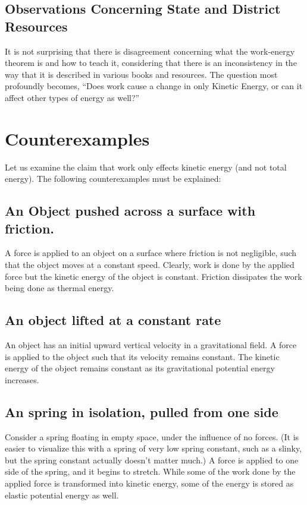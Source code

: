 \documentclass[letterpaper, 12pt]{article}
\begin{document}
\subsection{Observations Concerning State and District Resources}

It is not surprising that there is disagreement concerning what the work-energy theorem is and how to teach it, considering that there is an inconsistency in the way that it is described in various books and resources.  The question most profoundly becomes, ``Does work cause a change in only Kinetic Energy, or can it affect other types of energy as well?''



\section{Counterexamples}
Let us examine the claim that work only effects kinetic energy (and not total energy).  The following counterexamples must be explained:

\subsection{An Object pushed across a surface with friction.}

A force is applied to an object on a surface where friction is not negligible, such that the object moves at a constant speed.  Clearly, work is done by the applied force but the kinetic energy of the object is constant. Friction dissipates the work being done as thermal energy. 


\subsection{An object lifted at a constant rate}
An object has an initial upward vertical velocity in a gravitational field. A force is applied to the object such that its velocity remains constant.  The kinetic energy of the object remains constant as its gravitational potential energy increases.

\subsection{An spring in isolation, pulled from one side}
Consider a spring floating in empty space, under the influence of no forces.  (It is easier to visualize this with a spring of very low spring constant, such as a slinky, but the spring constant actually doesn't matter much.)  A force is applied to one side of the spring, and it begins to stretch.  While some of the work done by the applied force is transformed into kinetic energy, some of the energy is stored as elastic potential energy as well.  
\end{document}
